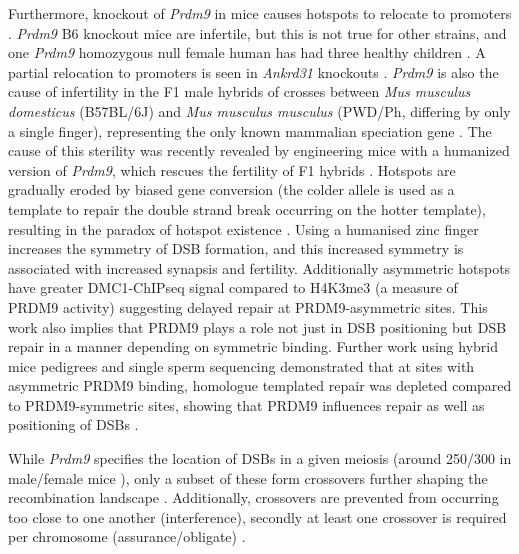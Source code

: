 Furthermore, knockout of \textit{Prdm9} in mice causes hotspots to relocate to promoters \parencite{Brick2012Genetic}.
\textit{Prdm9} B6 knockout mice are infertile, but this is not true for other strains, and one \textit{Prdm9} homozygous null female human has had three healthy children \parencite{Hayashi2005histone, Mihola2019Histone, Narasimhan2016Health}.
A partial relocation to promoters is seen in \textit{Ankrd31} knockouts \parencite{Boekhout2019REC114, Papanikos2018ANKRD31}.
\textit{Prdm9} is also the cause of infertility in the F1 male hybrids of crosses between \textit{Mus musculus domesticus} (B57BL/6J) and \textit{Mus musculus musculus} (PWD/Ph, differing by only a single finger), representing the only known mammalian speciation gene \parencite{Forejt1974Genetic, Mihola2009Mouse}.
The cause of this sterility was recently revealed by engineering mice with a humanized version of \textit{Prdm9}, which rescues the fertility of F1 hybrids \parencite{Davies2016Reengineering}.
Hotspots are gradually eroded by biased gene conversion (the colder allele is used as a template to repair the double strand break occurring on the hotter template), resulting in the paradox of hotspot existence \parencite{Boulton1997hotspot, Coop2007Live, Myers2010Drive, Baker2015PRDM9}.
Using a humanised zinc finger increases the symmetry of DSB formation, and this increased symmetry is associated with increased synapsis and fertility.
Additionally asymmetric hotspots have greater DMC1-ChIPseq signal compared to H4K3me3 (a measure of PRDM9 activity) suggesting delayed repair at PRDM9-asymmetric sites.
This work also implies that PRDM9 plays a role not just in DSB positioning but DSB repair in a manner depending on symmetric binding.
Further work using hybrid mice pedigrees and single sperm sequencing demonstrated that at sites with asymmetric PRDM9 binding, homologue templated repair was depleted compared to PRDM9-symmetric sites, showing that PRDM9 influences repair as well as positioning of DSBs \parencite{Li2019highresolution, Hinch2019Factors}.

While \textit{Prdm9} specifies the location of DSBs in a given meiosis (around 250/300 in male/female mice \parencite{Baudat2007Regulating}), only a subset of these form crossovers further shaping the recombination landscape \parencite{Youds2011choice}.
Additionally, crossovers are prevented from occurring too close to one another (interference), secondly at least one crossover is required per chromosome (assurance/obligate) \parencite{Fledel-Alon2009BroadScale, Hunter2015Meiotic, Otto2019Crossover}.



